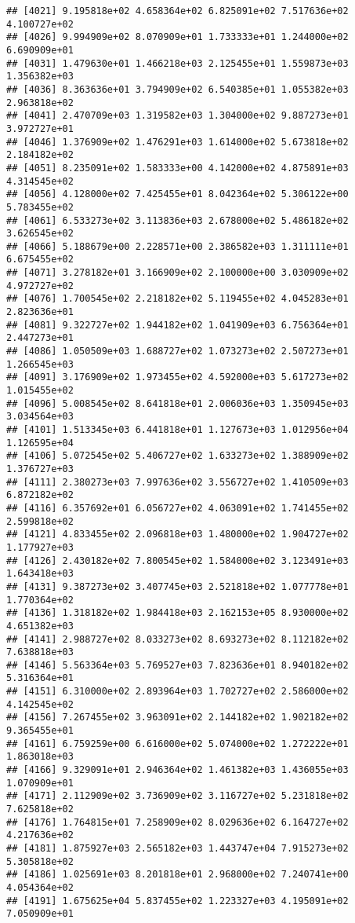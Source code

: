 \documentclass[]{article}
\begin{document}
\begin{verbatim}
## [4021] 9.195818e+02 4.658364e+02 6.825091e+02 7.517636e+02 4.100727e+02
## [4026] 9.994909e+02 8.070909e+01 1.733333e+01 1.244000e+02 6.690909e+01
## [4031] 1.479630e+01 1.466218e+03 2.125455e+01 1.559873e+03 1.356382e+03
## [4036] 8.363636e+01 3.794909e+02 6.540385e+01 1.055382e+03 2.963818e+02
## [4041] 2.470709e+03 1.319582e+03 1.304000e+02 9.887273e+01 3.972727e+01
## [4046] 1.376909e+02 1.476291e+03 1.614000e+02 5.673818e+02 2.184182e+02
## [4051] 8.235091e+02 1.583333e+00 4.142000e+02 4.875891e+03 4.314545e+02
## [4056] 4.128000e+02 7.425455e+01 8.042364e+02 5.306122e+00 5.783455e+02
## [4061] 6.533273e+02 3.113836e+03 2.678000e+02 5.486182e+02 3.626545e+02
## [4066] 5.188679e+00 2.228571e+00 2.386582e+03 1.311111e+01 6.675455e+02
## [4071] 3.278182e+01 3.166909e+02 2.100000e+00 3.030909e+02 4.972727e+02
## [4076] 1.700545e+02 2.218182e+02 5.119455e+02 4.045283e+01 2.823636e+01
## [4081] 9.322727e+02 1.944182e+02 1.041909e+03 6.756364e+01 2.447273e+01
## [4086] 1.050509e+03 1.688727e+02 1.073273e+02 2.507273e+01 1.266545e+03
## [4091] 3.176909e+02 1.973455e+02 4.592000e+03 5.617273e+02 1.015455e+02
## [4096] 5.008545e+02 8.641818e+01 2.006036e+03 1.350945e+03 3.034564e+03
## [4101] 1.513345e+03 6.441818e+01 1.127673e+03 1.012956e+04 1.126595e+04
## [4106] 5.072545e+02 5.406727e+02 1.633273e+02 1.388909e+02 1.376727e+03
## [4111] 2.380273e+03 7.997636e+02 3.556727e+02 1.410509e+03 6.872182e+02
## [4116] 6.357692e+01 6.056727e+02 4.063091e+02 1.741455e+02 2.599818e+02
## [4121] 4.833455e+02 2.096818e+03 1.480000e+02 1.904727e+02 1.177927e+03
## [4126] 2.430182e+02 7.800545e+02 1.584000e+02 3.123491e+03 1.643418e+03
## [4131] 9.387273e+02 3.407745e+03 2.521818e+02 1.077778e+01 1.770364e+02
## [4136] 1.318182e+02 1.984418e+03 2.162153e+05 8.930000e+02 4.651382e+03
## [4141] 2.988727e+02 8.033273e+02 8.693273e+02 8.112182e+02 7.638818e+03
## [4146] 5.563364e+03 5.769527e+03 7.823636e+01 8.940182e+02 5.316364e+01
## [4151] 6.310000e+02 2.893964e+03 1.702727e+02 2.586000e+02 4.142545e+02
## [4156] 7.267455e+02 3.963091e+02 2.144182e+02 1.902182e+02 9.365455e+01
## [4161] 6.759259e+00 6.616000e+02 5.074000e+02 1.272222e+01 1.863018e+03
## [4166] 9.329091e+01 2.946364e+02 1.461382e+03 1.436055e+03 1.070909e+01
## [4171] 2.112909e+02 3.736909e+02 3.116727e+02 5.231818e+02 7.625818e+02
## [4176] 1.764815e+01 7.258909e+02 8.029636e+02 6.164727e+02 4.217636e+02
## [4181] 1.875927e+03 2.565182e+03 1.443747e+04 7.915273e+02 5.305818e+02
## [4186] 1.025691e+03 8.201818e+01 2.968000e+02 7.240741e+00 4.054364e+02
## [4191] 1.675625e+04 5.837455e+02 1.223327e+03 4.195091e+02 7.050909e+01

\end{verbatim}
\end{document}
